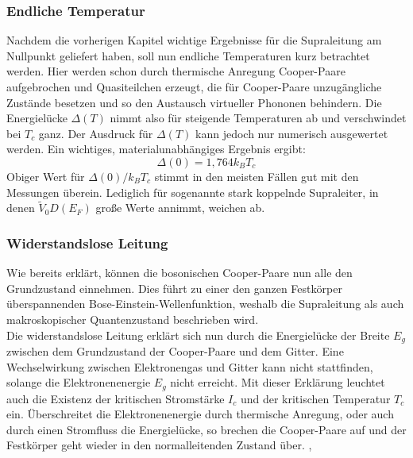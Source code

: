 		\subsubsection{Endliche Temperatur}
Nachdem die vorherigen Kapitel wichtige Ergebnisse für die Supraleitung am 
Nullpunkt geliefert haben, soll nun endliche Temperaturen kurz betrachtet werden.
Hier werden schon durch thermische Anregung Cooper-Paare aufgebrochen und 
Quasiteilchen erzeugt, die für Cooper-Paare unzugängliche Zustände besetzen und
so den Austausch virtueller Phononen behindern. Die Energielücke $\Delta(T)$ nimmt
also für steigende Temperaturen ab und verschwindet bei $T_c$ ganz. Der Ausdruck
für $\Delta(T)$ kann jedoch nur numerisch ausgewertet werden. Ein wichtiges, 
materialunabhängiges Ergebnis ergibt:
\[
	\Delta(0) = 1,764 k_B T_c
\]
Obiger Wert für $\Delta(0)/k_BT_c$ stimmt in den meisten Fällen gut mit den 
Messungen überein. Lediglich für sogenannte stark koppelnde Supraleiter, in denen
$\tilde{V}_0 D(E_F)$ große Werte annimmt, weichen ab.

		\subsubsection{Widerstandslose Leitung}
Wie bereits erklärt, können die bosonischen Cooper-Paare nun alle den Grundzustand
einnehmen. Dies führt zu einer den ganzen Festkörper überspannenden 
Bose-Einstein-Wellenfunktion, weshalb die Supraleitung als auch makroskopischer
Quantenzustand beschrieben wird. \\
Die widerstandslose Leitung erklärt sich nun durch die Energielücke der Breite 
$E_g$ zwischen dem Grundzustand der Cooper-Paare und dem Gitter. Eine Wechselwirkung
zwischen Elektronengas und Gitter kann nicht stattfinden, solange die 
Elektronenenergie $E_g$ nicht erreicht. Mit dieser Erklärung leuchtet auch die 
Existenz der kritischen Stromstärke $I_c$ und der kritischen Temperatur $T_c$ ein.
Überschreitet die Elektronenenergie durch thermische Anregung, oder auch durch
einen Stromfluss die Energielücke, so brechen die Cooper-Paare auf und der 
Festkörper geht wieder in den normalleitenden Zustand über. \cite{hunklinger}, 
\cite{suprawiki}

